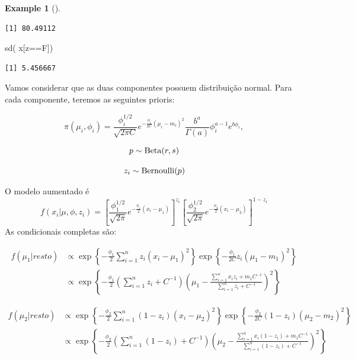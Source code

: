 \documentclass[
  letterpaper,
  DIV=11,
  numbers=noendperiod]{scrreprt}
\newenvironment{Shaded}{\begin{snugshade}}{\end{snugshade}}
\newcommand{\FunctionTok}[1]{\textcolor[rgb]{0.28,0.35,0.67}{#1}}
\newcommand{\NormalTok}[1]{\textcolor[rgb]{0.00,0.23,0.31}{#1}}
\newcommand{\SpecialCharTok}[1]{\textcolor[rgb]{0.37,0.37,0.37}{#1}}
\theoremstyle{definition}
\theoremstyle{plain}
\theoremstyle{definition}
\newtheorem{example}{Example}[chapter]
\theoremstyle{remark}
\begin{document}
\begin{example}[]
\begin{verbatim}
[1] 80.49112
\end{verbatim}

\begin{Shaded}
\begin{Highlighting}[]
\FunctionTok{sd}\NormalTok{( x[z}\SpecialCharTok{==}\NormalTok{F])}
\end{Highlighting}
\end{Shaded}

\begin{verbatim}
[1] 5.456667
\end{verbatim}

Vamos considerar que as duas componentes possuem distribuição normal.
Para cada componente, teremos as seguintes prioris:

\[\pi(\mu_i,\phi_i)=\frac{\phi^{1/2}_i}{\sqrt{2\pi C}}e^{-\frac{\phi_i}{2C}(\mu_i-m_i)^2}\frac{b^a}{\Gamma(a)}\phi_i^{a-1}e^{b\phi_i},\]

\[p\sim\hbox{Beta}(r,s)\]

\[z_i\sim\hbox{Bernoulli}(p)\]

O modelo aumentado é
\[f(x_i|\mu,\phi,z_{i})=\left[\frac{\phi_1^{1/2}}{\sqrt{2\pi}}e^{-\frac{\phi_1}{2}(x_i-\mu_1)}\right]^{z_i}\left[\frac{\phi_2^{1/2}}{\sqrt{2\pi}}e^{-\frac{\phi_2}{2}(x_i-\mu_2)}\right]^{1-z_i}\]
As condicionais completas são:

\[\begin{align}f(\mu_1|resto) &\propto \exp\left\{-\frac{\phi_1}{2}\sum_{i=1}^n z_i(x_i-\mu_1)^2\right\}\exp\left\{-\frac{\phi_1}{2C} z_i(\mu_1-m_1)^2\right\}\\&\propto \exp\left\{-\frac{\phi_1}{2}\left(\sum_{i=1}^n z_i+C^{-1}\right) \left(\mu_1-\frac{\sum_{i=1}^{n}x_iz_i+m_1C^{-1}}{\sum_{i=1}^n z_i+C^{-1}}\right)^2\right\}\end{align}\]

\[\begin{align}f(\mu_2|resto) &\propto \exp\left\{-\frac{\phi_2}{2}\sum_{i=1}^n (1-z_i)(x_i-\mu_2)^2\right\}\exp\left\{-\frac{\phi_2}{2C} (1-z_i)(\mu_2-m_2)^2\right\}\\&\propto \exp\left\{-\frac{\phi_2}{2}\left(\sum_{i=1}^n (1-z_i)+C^{-1}\right) \left(\mu_2-\frac{\sum_{i=1}^{n}x_i(1-z_i)+m_1C^{-1}}{\sum_{i=1}^n (1-z_i)+C^{-1}}\right)^2\right\}\end{align}\]


\end{example}
\end{document}
